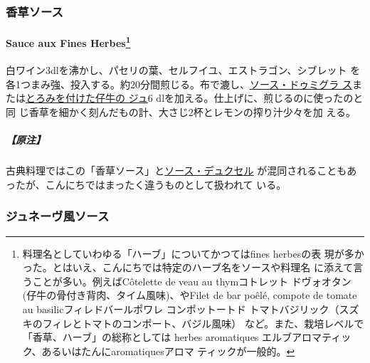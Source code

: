 \begin{recette}
\maeaki

\hypertarget{ux9999ux8349ux30bdux30fcux30b9}{%
\subsubsection{香草ソース}\label{ux9999ux8349ux30bdux30fcux30b9}}

\hypertarget{sauce-aux-fines-herbes}{%
\paragraph[Sauce aux Fines Herbes]{\texorpdfstring{Sauce aux Fines
Herbes\footnote{料理名としていわゆる「ハーブ」についてかつてはfines
  herbesの表
  現が多かった。とはいえ、こんにちでは特定のハーブ名をソースや料理名
  に添えて言うことが多い。例えばCôtelette de veau au thymコトレット
  ドヴォオタン(仔牛の骨付き背肉、タイム風味)、やFilet de bar poêlé,
  compote de tomate au basilicフィレドバールポワレ コンポットートド
  トマトバジリック（スズキのフィレとトマトのコンポート、バジル風味）
  など。また、栽培レベルで「香草、ハーブ」の総称としては herbes
  aromatiques エルブアロマティック、あるいはたんにaromatiquesアロマ
  ティックが一般的。}}{Sauce aux Fines Herbes}}\label{sauce-aux-fines-herbes}}

  
 

白ワイン3dlを沸かし、パセリの葉、セルフイユ、エストラゴン、シブレット
を各1つまみ強、投入する。約20分間煎じる。布で漉し、\protect\hyperlink{sauce-demi-glace}{ソース・ドゥミグラ
ス}または\protect\hyperlink{jus-de-veau-lie}{とろみを付けた仔牛の ジュ}6
dlを加える。仕上げに、煎じるのに使ったのと同
じ香草を細かく刻んだもの計、大さじ2\undemi{}杯とレモンの搾り汁少々を加
える。

\hypertarget{ux539fux6ce8-2}{%
\subparagraph{【原注】}\label{ux539fux6ce8-2}}

古典料理ではこの「香草ソース」と\protect\hyperlink{sauce-duxelles}{ソース・デュクセル}
が混同されることもあったが、こんにちではまったく違うものとして扱われて
いる。

\maeaki

\hypertarget{ux30b8ux30e5ux30cdux30fcux30f4ux98a8ux30bdux30fcux30b9}{%
\subsubsection{ジュネーヴ風ソース}\label{ux30b8ux30e5ux30cdux30fcux30f4ux98a8ux30bdux30fcux30b9}}


\end{recette}
